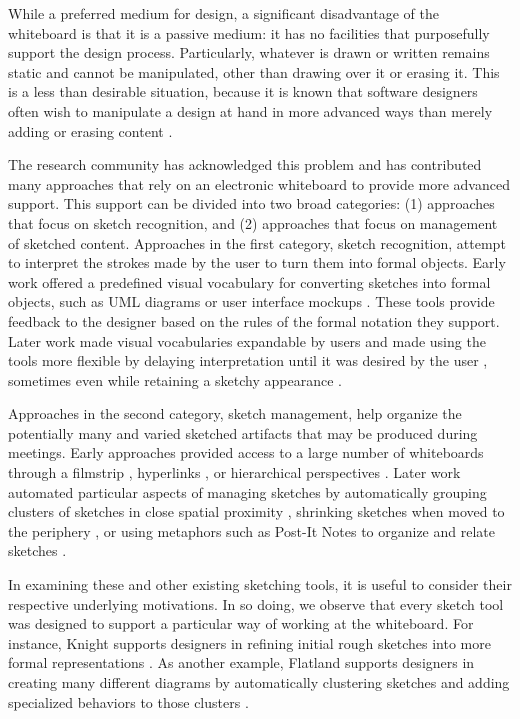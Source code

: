 While a preferred medium for design, a significant disadvantage of the whiteboard is that it is a passive medium: it has no facilities that purposefully support the design process. Particularly, whatever is drawn or written remains static and cannot be manipulated, other than drawing over it or erasing it. This is a less than desirable situation, because it is known that software designers often wish to manipulate a design at hand in more advanced ways than merely adding or erasing content \cite{dekel2007notation}.

The research community has acknowledged this problem and has contributed many approaches that rely on an electronic whiteboard to provide more advanced support. This support can be divided into two broad categories: (1) approaches that focus on sketch recognition, and (2) approaches that focus on management of sketched content. Approaches in the first category, sketch recognition, attempt to interpret the strokes made by the user to turn them into formal  objects. Early work offered a predefined visual vocabulary for converting sketches into formal objects, such as UML diagrams \cite{chen2008sumlow} or user interface mockups \cite{landay1995interactive}. These tools provide feedback to the designer based on the rules of the formal notation they support. Later work made visual vocabularies expandable by users \cite{hammond2006ladder} and made using the tools more flexible by delaying interpretation until it was desired by the user \cite{damm2000supporting}, sometimes even while retaining a sketchy appearance \cite{chung2005inkkit}.

Approaches in the second category, sketch management, help organize the potentially many and varied sketched artifacts that may be produced during meetings. Early approaches provided access to a large number of whiteboards through a filmstrip \cite{stefik1987beyond}, hyperlinks \cite{Streitz:1994:DIM:192844.193044}, or hierarchical perspectives \cite{newman2003denim}. Later work automated particular aspects of managing sketches by automatically grouping clusters of sketches in close spatial proximity \cite{mynatt1999flatland}, shrinking sketches when moved to the periphery \cite{guimbretiere2001fluid}, or using metaphors such as Post-It Notes to organize and relate sketches \cite{klemmer2001designers}.  

In examining these and other existing sketching tools, it is useful to consider their respective underlying motivations. In so doing, we observe that every sketch tool was designed to support a particular way of working at the whiteboard. For instance, Knight supports designers in refining initial rough sketches into more formal representations \cite{damm2000supporting}. As another example, Flatland supports designers in creating many different diagrams by automatically clustering sketches and adding specialized behaviors to those clusters \cite{mynatt1999flatland}.

